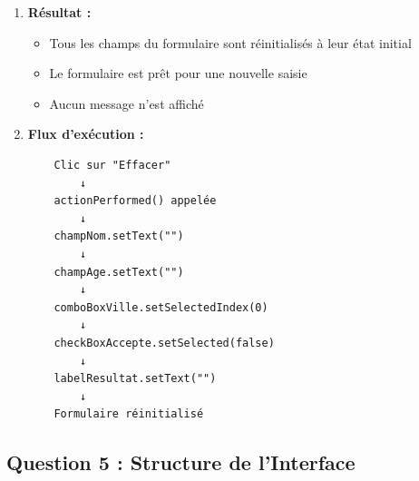 \documentclass[11pt,a4paper]{article}
\begin{document}
\begin{correctionbox}
\begin{enumerate}
\begin{enumerate}
        \item \textbf{Effacement du message de résultat :}
        \begin{itemize}
            \item \texttt{labelResultat.setText("")} : vide le label de résultat
            \item Supprime tout message d'erreur ou de succès précédent
        \end{itemize}
    \end{enumerate}
    
    \item \textbf{Résultat :}
    \begin{itemize}
        \item Tous les champs du formulaire sont réinitialisés à leur état initial
        \item Le formulaire est prêt pour une nouvelle saisie
        \item Aucun message n'est affiché
    \end{itemize}
    
    \item \textbf{Flux d'exécution :}
    \begin{verbatim}
    Clic sur "Effacer"
        ↓
    actionPerformed() appelée
        ↓
    champNom.setText("")
        ↓
    champAge.setText("")
        ↓
    comboBoxVille.setSelectedIndex(0)
        ↓
    checkBoxAccepte.setSelected(false)
        ↓
    labelResultat.setText("")
        ↓
    Formulaire réinitialisé
    \end{verbatim}
\end{enumerate}
\end{correctionbox}

\subsection{Question 5 : Structure de l'Interface}
\end{document}
